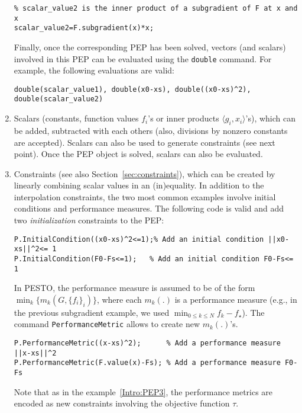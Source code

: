 \documentclass[11pt,a4paper]{article}
\newcommand{\inner}[2]{{\langle #1, #2\rangle}}
\begin{document}
\begin{enumerate}
\begin{lstlisting}
% scalar_value2 is the inner product of a subgradient of F at x and x
scalar_value2=F.subgradient(x)*x;
		\end{lstlisting}
		Finally, once the corresponding PEP has been solved, vectors (and scalars) involved in this PEP can be evaluated using the \verb?double? command. For example, the following evaluations are valid:\\[-1cm]
		\begin{lstlisting}
double(scalar_value1), double(x0-xs), double((x0-xs)^2), double(scalar_value2)
		\end{lstlisting}
		\item Scalars (constants, function values $f_i$'s or inner products $\inner{g_i}{x_i}$'s), which can be added, subtracted with each others (also, divisions by nonzero constants are accepted). Scalars can also be used to generate constraints (see next point). Once the PEP object is solved, scalars can also be evaluated.
		\item Constraints (see also Section~\ref{sec:constraints}), which can be created by linearly combining scalar values in an (in)equality. In addition to the interpolation constraints, the two most common examples involve initial conditions and performance measures. The following code is valid and add two \emph{initialization} constraints to the PEP:\\[-1cm]
		\begin{lstlisting}
P.InitialCondition((x0-xs)^2<=1);% Add an initial condition ||x0-xs||^2<= 1
P.InitialCondition(F0-Fs<=1);	% Add an initial condition F0-Fs<= 1
		\end{lstlisting}
		In PESTO, the performance measure is assumed to be of the form $\min_k \{m_k(G,\{f_i\}_i)\}$, where each $m_k(.)$ is a performance measure (e.g., in the previous subgradient example, we used $\min_{0\leq k \leq N} f_k-f_\star$). The command \verb?PerformanceMetric? allows to create new $m_k(.)$'s.\\[-1cm]
		\begin{lstlisting}
P.PerformanceMetric((x-xs)^2); 		% Add a performance measure ||x-xs||^2
P.PerformanceMetric(F.value(x)-Fs);	% Add a performance measure F0-Fs
		\end{lstlisting}
		Note that as in the example~\eqref{Intro:PEP3}, the performance metrics are encoded as new constraints involving the objective function $\tau$.
	\end{enumerate}
	\newpage
\end{document}
